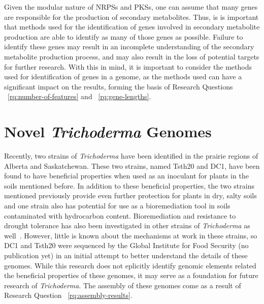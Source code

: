  Given the modular nature of NRPSs and PKSs, one can assume that many genes are responsible for the production of secondary metabolites. Thus, is is important that methods used for the identification of genes involved in secondary metabolite production are able to identify as many of those genes as possible. Failure to identify these genes may result in an incomplete understanding of the secondary metabolite production process, and may also result in the loss of potential targets for further research. With this in mind, it is important to consider the methods used for identification of genes in a genome, as the methods used can have a significant impact on the results, forming the basis of Research Questions ~\ref{rq:number-of-features} and ~\ref{rq:gene-lengths}. 
 




\section{Novel \textit{Trichoderma} Genomes}

Recently, two strains of \textit{Trichoderma}
have been identified in the prairie regions of Alberta and
Saskatchewan. These two strains, named Tsth20 and DC1, have been found
to have beneficial properties when used as an inoculant for plants in
the soils mentioned before. In addition to these beneficial
properties, the two strains mentioned previously provide even further
protection for plants in dry, salty soils and one strain also has
potential for use as a bioremediation tool in soils contaminated with
hydrocarbon content. Bioremediation and resistance to drought
tolerance has also been investigated in other strains of
\textit{Trichoderma} as well~\cite{senizza2023}. However,
little is known about the mechanisms at work in these strains, so DC1
and Tsth20 were sequenced by the Global Institute for Food Security
(no publication yet) in an initial attempt to better understand the
details of these genomes. While this research does not eplicitly
identify genomic elements related the beneficial properties of these
genomes, it may serve as a foundation for future research of
\textit{Trichoderma}. The assembly of these genomes come as a result of Research Question ~\ref{rq:assembly-results}.

